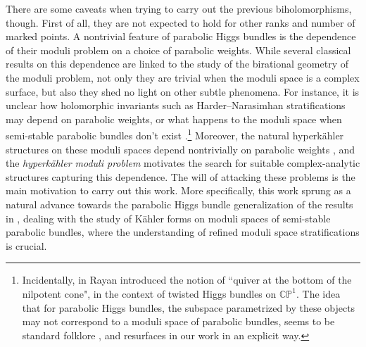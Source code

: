 \documentclass[10pt,a4paper]{amsart}
\newcommand{\field}[1]{\ensuremath{\mathbb{#1}}}
\newcommand{\CC}{\field{C}}
\newcommand{\PP}{\field{P}}
\numberwithin{equation}{section}
\begin{document}
There are some caveats when trying to carry out the previous biholomorphisms, though. First of all, they are not expected to hold for other ranks and number of marked points.
A nontrivial feature of parabolic Higgs bundles is the dependence of their moduli problem on a choice of parabolic weights.
While several classical results on this dependence \cite{Nak96, Thad02} are linked to the study of the birational geometry of the moduli problem, not only they are trivial when the moduli space is a complex surface, but also they shed no light on other subtle phenomena. For instance, it is unclear how holomorphic invariants such as Harder--Narasimhan stratifications may depend on parabolic weights, or what happens to the moduli space when semi-stable parabolic bundles don't exist \cite{Bau91, Bis98}.\footnote{Incidentally, in \cite{Ray17} Rayan introduced the notion of ``quiver at the bottom of the nilpotent cone", in the context of twisted Higgs bundles on $\CC\PP^{1}$. The idea that for parabolic Higgs bundles, the subspace parametrized by these objects may not correspond to a moduli space of parabolic bundles, seems to be standard folklore \cite{Bla15}, and resurfaces in our work in an explicit way.} Moreover, the natural hyperk\"ahler structures on these moduli spaces depend nontrivially on parabolic weights \cite{KW18, MT21}, and the \textit{hyperk\"ahler moduli problem} motivates the search for suitable complex-analytic structures capturing this dependence. The will of attacking these problems is the main motivation to carry out this work. More specifically, this work sprung as a natural advance towards the parabolic Higgs bundle generalization of the results in \cite{MT21}, dealing with the study of K\"ahler forms on moduli spaces of semi-stable parabolic bundles, where the understanding of refined moduli space stratifications is crucial.
\end{document}
